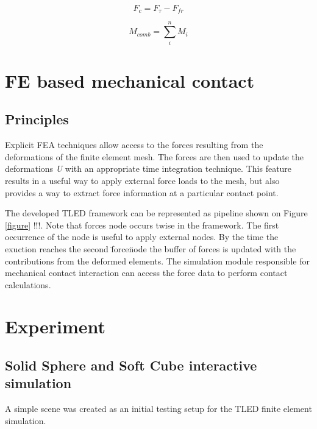 \begin{equation}
\label{findingFc}
F_c = F_{\tau} - F_{fr}
\end{equation}

\begin{equation}
\label{combineMoments}
M_{comb}=\sum_{i}^{n}M_{i}
\end{equation}

\section{FE based mechanical contact}
  \subsection{Principles}

  Explicit FEA techniques allow access to the forces resulting from the deformations of the finite element mesh. The forces are then used to update the deformations \textit{U} with an appropriate time integration technique. This feature results in a useful way to apply external force loads to the mesh, but also provides a way to extract force information at a particular contact point.

  The developed TLED framework can be represented as pipeline shown on Figure \ref{figure} !!!. Note that forces node occurs twise in the framework. The first occurrence of the node is useful to apply external nodes. By the time the exuction reaches the second \"force\" node the buffer of forces is updated with the contributions from the deformed elements. The simulation module responsible for mechanical contact interaction can access the force data to perform contact calculations.

\section{Experiment}

\subsection{Solid Sphere and Soft Cube interactive simulation}

A simple scene was created as an initial testing setup for the TLED finite element simulation.
